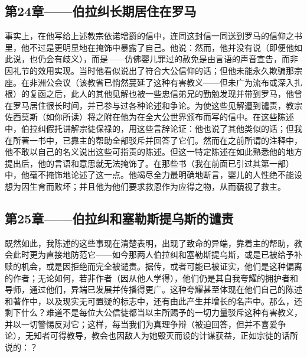 
\subsection{第24章——伯拉纠长期居住在罗马}

事实上，在他写给上述教宗依诺增爵的信中，连同这封信一同送到罗马的信仰之书里，他不过是更明显地在掩饰中暴露了自己。他说：然而，他并没有说（即便他如此说，也仍会有歧义），而是——仿佛婴儿罪过的赦免是由言语的声音宣告，而非因礼节的效用实现。当时他看似说出了符合大公信仰的话；但他未能永久欺骗那宗座。在非洲公会议（该教省已悄然蔓延了这种有害教义——但未广为流布或深入扎根）的复函之后，此人的其他见解也被一些忠信弟兄的勤勉发现并带到罗马，他曾在罗马居住很长时间，并已参与过各种论述和争论。为使这些见解遭到谴责，教宗佐西莫斯（如你所读）将之附在他为在全大公世界颁布而写的信中。在这些陈述中，伯拉纠假托讲解宗徒保禄的，用这些言辞论证：他也说了其他类似的话；但我在所著一书中，已靠主的帮助全部驳斥并回答了它们。然而在之前所谓的注释中，他不敢以自己的名义说出这些可指责的陈述。但这一特定陈述在如此熟悉他的地方提出后，他的言语和意思就无法掩饰了。在那些书（我在前面已引过其第一部）中，他毫不掩饰地论述了这一点。他竭尽全力最明确地断言，婴儿的人性绝不能设想为因生育而败坏；并且他为他们要求救恩作为应得之物，从而藐视了救主。\par


\subsection{第25章——伯拉纠和塞勒斯提乌斯的谴责}

既然如此，我陈述的这些事现在清楚表明，出现了致命的异端，靠着主的帮助，教会此时更为直接地防范它——如今那两人伯拉纠和塞勒斯提乌斯，或是已被给予补赎的机会，或是因拒绝而完全被谴责。据传，或者可能已被证实，他们是这种偏离的作者；无论如何，若非作者（因从他人学得），他们仍是其自我夸耀的拥护者和导师，通过他们，异端已发展并传播得更广。这种夸耀甚至体现在他们自己的陈述和著作中，以及现实无可置疑的标志中，还有由此产生并增长的名声中。那么，还剩下什么？难道不是每位大公信徒都当以主所赐予的一切力量驳斥这种有害教义，并以一切警惕反对它；这样，每当我们为真理争辩（被迫回答，但并不喜爱争论），无知者可得教导，教会也因敌人为她毁灭而设的计谋获益，正如宗徒的话所说的：？\par

